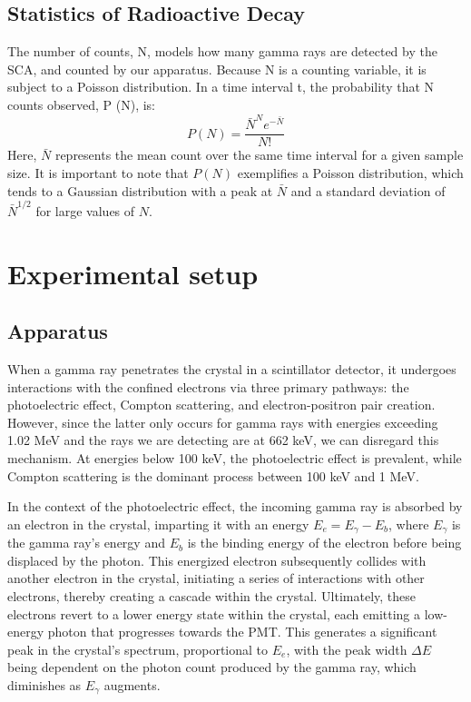 \documentclass[10pt,letterpaper,onecolumn]{article}
\begin{document}
\subsection{Statistics of Radioactive Decay}
The number of counts, N, models how many gamma rays are detected by the SCA, and counted
by our apparatus. Because N is a counting variable, it is subject to a Poisson distribution.
In a time interval t, the probability
that N counts observed, P (N), is:
$$
P(N) = \frac{\bar{N}^N e^{-\bar{N}}}{N!}
$$
Here, \( \bar{N} \) represents the mean 
count over the same time interval for a given sample size.
 It is important to note that \( P(N) \) exemplifies a Poisson distribution, 
 which tends to a Gaussian distribution with a peak at \( \bar{N} \) 
 and a standard deviation of \( \bar{N}^{1/2} \) for large values of \( N \).

\section{Experimental setup}
\subsection{Apparatus}
When a gamma ray penetrates the crystal in a scintillator detector, 
it undergoes interactions with the confined 
electrons via three primary pathways: the photoelectric effect, Compton scattering,
and electron-positron pair creation. However, since the latter only occurs for gamma 
rays with energies exceeding 1.02 MeV and the rays we are detecting are at 662 keV, 
we can disregard this mechanism. At energies below 100 keV, the photoelectric effect 
is prevalent, while Compton scattering is the dominant process between 100 keV and 1 MeV.

In the context of the photoelectric effect, the incoming gamma ray is absorbed by an 
electron in the crystal, imparting it with an energy \(E_e = E_\gamma - E_b\), 
where \(E_\gamma\) is the gamma ray's energy and \(E_b\) is the binding energy of the 
electron before being displaced by the photon. This energized electron subsequently 
collides with another electron in the crystal, initiating a series of interactions with 
other electrons, thereby creating a cascade within the crystal. Ultimately, these 
electrons revert to a lower energy state within the crystal, each emitting a low-energy 
photon that progresses towards the PMT. This generates a significant peak in the
crystal's spectrum, proportional to \(E_e\), with the peak width \(\Delta E\) being 
dependent on the photon count produced by the gamma ray, which diminishes as 
\(E_\gamma\) augments.
\end{document}
